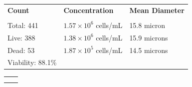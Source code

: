 \documentclass[UTF8,10pt,a4paper,fontset=fandol]{ctexart}
\newcommand{\fieldvalue}[1]{#1}
\begin{document}
\small
\begin{tabularx}{\textwidth}{@{}l X X@{}}
\textbf{Count} & \textbf{Concentration} & \textbf{Mean Diameter} \\
\underline{\hspace{4.5em}} & \underline{\hspace{8em}} & \underline{\hspace{8em}} \\[2pt]

Total: \fieldvalue{441}
&
\fieldvalue{$1.57\times10^{6}$ cells/mL}
&
\fieldvalue{15.8 micron}
\\

Live: \fieldvalue{388}
&
\fieldvalue{$1.38\times10^{6}$ cells/mL}
&
\fieldvalue{15.9 microns}
\\

Dead: \fieldvalue{53}
&
\fieldvalue{$1.87\times10^{5}$ cells/mL}
&
\fieldvalue{14.5 microns}
\\

Viability: \fieldvalue{88.1\%}
&
&
\end{tabularx}
\normalsize

\medskip

\begin{center}
\begin{tabular}{cc}
\fbox{\rule{0pt}{0.28\textheight}\rule{0.43\textwidth}{0pt}}
&
\fbox{\rule{0pt}{0.28\textheight}\rule{0.43\textwidth}{0pt}}
\\[1em]
\fbox{\rule{0pt}{0.28\textheight}\rule{0.43\textwidth}{0pt}}
&
\fbox{\rule{0pt}{0.28\textheight}\rule{0.43\textwidth}{0pt}}
\end{tabular}
\end{center}
\end{document}
